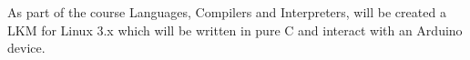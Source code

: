 As part of the course Languages, Compilers and Interpreters, will be created a L\-K\-M for Linux 3.\-x which will be written in pure C and interact with an Arduino device. 
